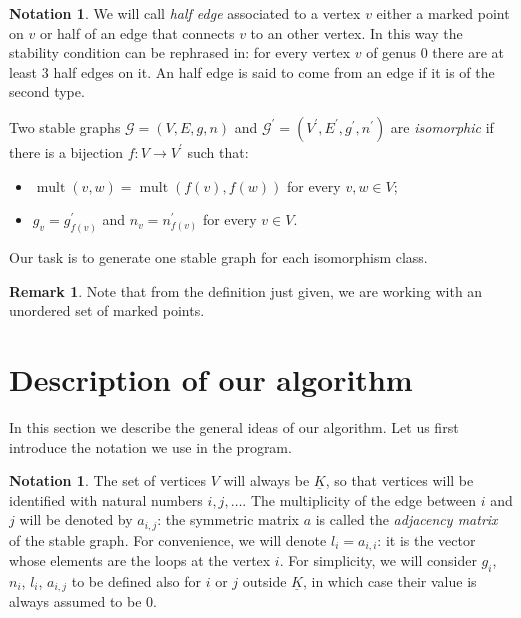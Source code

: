 \documentclass{amsart}
\theoremstyle{plain}
\theoremstyle{definition}
\newtheorem{remark}[theorem]{Remark}
\newtheorem{notation}[theorem]{Notation}
\DeclareMathOperator{\mult}{mult}
\newcommand{\graph}{\mathcal{G}}
\newcommand{\ubar}[1]{\underline{#1}}
\begin{document}
\begin{notation}
  We will call \emph{half edge} associated to a vertex $v$ either a
  marked point on $v$ or half of an edge that connects $v$ to an other
  vertex. In this way the stability condition can be rephrased in: for
  every vertex $v$ of genus $0$ there are at least $3$ half edges on
  it. An half edge is said to come from an edge if it is of the
  second type.
\end{notation}

Two stable graphs $\graph = (V, E, g, n)$ and $\graph^\prime =
(V^\prime, E^\prime, g^\prime, n^\prime)$ are \emph{isomorphic\/} if
there is a bijection $f\colon V \to V^\prime$ such that:
\begin{itemize}
\item $\mult(v, w) = \mult(f(v), f(w))$ for every $v, w \in V$;
\item $g_v = g^\prime_{f(v)}$ and $n_v = n^\prime_{f(v)}$ for every $v
  \in V$.
\end{itemize}
Our task is to generate one stable graph for each isomorphism class.

\begin{remark}
  Note that from the definition just given, we are working with an
  unordered set of marked points.
\end{remark}



\section{Description of our algorithm}

In this section we describe the general ideas of our algorithm. Let us
first introduce the notation we use in the program.

\begin{notation}\label{not:gnla}
  The set of vertices $V$ will always be $\ubar{K}$, so that vertices
  will be identified with natural numbers $i, j, \dots$. The
  multiplicity of the edge between $i$ and $j$ will be denoted by
  $a_{i,j}$: the symmetric matrix $a$ is called the \emph{adjacency
    matrix} of the stable graph. For convenience, we will denote $l_i
  = a_{i,i}$: it is the vector whose elements are the loops at the
  vertex $i$. For simplicity, we will consider $g_i$, $n_i$, $l_i$,
  $a_{i,j}$ to be defined also for $i$ or $j$ outside $\ubar{K}$, in
  which case their value is always assumed to be $0$.
\end{notation}
\end{document}
